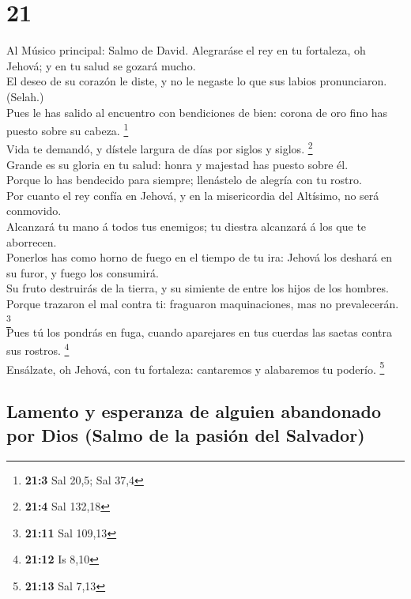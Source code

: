 \hypertarget{section-20}{%
\section{21}\label{section-20}}

 Al Músico principal: Salmo de David. Alegraráse el rey en
tu fortaleza, oh Jehová; y en tu salud se gozará mucho.\\
 El deseo de su corazón le diste, y no le negaste lo que sus
labios pronunciaron. (Selah.)\\
 Pues le has salido al encuentro con bendiciones de bien:
corona de oro fino has puesto sobre su cabeza. \footnote{\textbf{21:3}
  Sal 20,5; Sal 37,4}\\
 Vida te demandó, y dístele largura de días por siglos y
siglos. \footnote{\textbf{21:4} Sal 132,18}\\
 Grande es su gloria en tu salud: honra y majestad has
puesto sobre él.\\
 Porque lo has bendecido para siempre; llenástelo de alegría
con tu rostro.\\
 Por cuanto el rey confía en Jehová, y en la misericordia
del Altísimo, no será conmovido.\\
 Alcanzará tu mano á todos tus enemigos; tu diestra
alcanzará á los que te aborrecen.\\
 Ponerlos has como horno de fuego en el tiempo de tu ira:
Jehová los deshará en su furor, y fuego los consumirá.\\
 Su fruto destruirás de la tierra, y su simiente de entre
los hijos de los hombres.\\
 Porque trazaron el mal contra ti: fraguaron maquinaciones,
mas no prevalecerán. \footnote{\textbf{21:11} Sal 109,13}\\
 Pues tú los pondrás en fuga, cuando aparejares en tus
cuerdas las saetas contra sus rostros. \footnote{\textbf{21:12} Is 8,10}\\
 Ensálzate, oh Jehová, con tu fortaleza: cantaremos y
alabaremos tu poderío. \footnote{\textbf{21:13} Sal 7,13}

\hypertarget{lamento-y-esperanza-de-alguien-abandonado-por-dios-salmo-de-la-pasiuxf3n-del-salvador}{%
\subsection{Lamento y esperanza de alguien abandonado por Dios (Salmo de
la pasión del
Salvador)}\label{lamento-y-esperanza-de-alguien-abandonado-por-dios-salmo-de-la-pasiuxf3n-del-salvador}}

